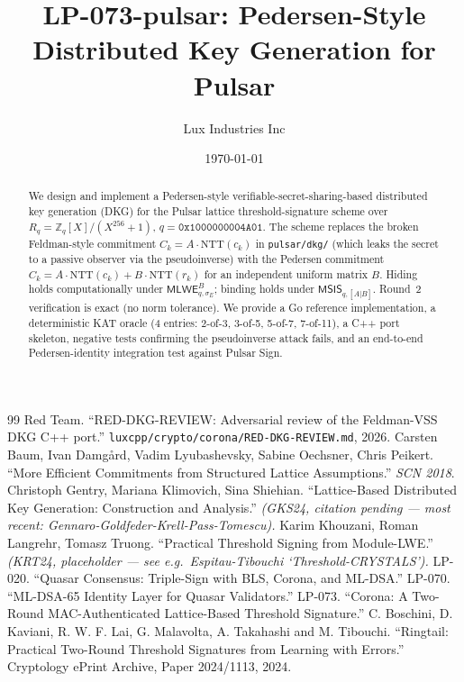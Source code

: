 \documentclass[11pt,a4paper]{article}
\title{LP-073-pulsar: Pedersen-Style Distributed Key Generation for Pulsar}
\author{Lux Industries Inc}
\date{\today}
\begin{document}
\maketitle

\begin{abstract}
We design and implement a Pedersen-style verifiable-secret-sharing-based
distributed key generation (DKG) for the Pulsar lattice threshold-signature
scheme over $R_q = \mathbb{Z}_q[X]/(X^{256}+1)$, $q = \mathtt{0x1000000004A01}$.
The scheme replaces the broken Feldman-style commitment
$C_k = A \cdot \mathrm{NTT}(c_k)$ in \texttt{pulsar/dkg/} (which leaks the
secret to a passive observer via the pseudoinverse) with the
Pedersen commitment $C_k = A \cdot \mathrm{NTT}(c_k) + B \cdot \mathrm{NTT}(r_k)$
for an independent uniform matrix $B$.  Hiding holds computationally under
$\mathsf{MLWE}_{q,\sigma_E}^B$; binding holds under
$\mathsf{MSIS}_{q,[A|B]}$.  Round~2 verification is exact (no norm
tolerance).  We provide a Go reference implementation, a deterministic KAT
oracle (4 entries: 2-of-3, 3-of-5, 5-of-7, 7-of-11), a C++ port skeleton,
negative tests confirming the pseudoinverse attack fails, and an
end-to-end Pedersen-identity integration test against Pulsar Sign.
\end{abstract}

\providecommand{\luxref}[1]{[#1]}



\begin{thebibliography}{99}
Red Team.  ``RED-DKG-REVIEW: Adversarial review of the Feldman-VSS DKG
C++ port.''  \texttt{luxcpp/crypto/corona/RED-DKG-REVIEW.md}, 2026.
Carsten Baum, Ivan Damg\aa{}rd, Vadim Lyubashevsky, Sabine Oechsner,
Chris Peikert.  ``More Efficient Commitments from Structured Lattice
Assumptions.''  \emph{SCN 2018}.
Christoph Gentry, Mariana Klimovich, Sina Shiehian.
``Lattice-Based Distributed Key Generation: Construction and Analysis.''
\emph{(GKS24, citation pending — most recent: Gennaro-Goldfeder-Krell-Pass-Tomescu).}
Karim Khouzani, Roman Langrehr, Tomasz Truong.
``Practical Threshold Signing from Module-LWE.''
\emph{(KRT24, placeholder — see e.g.\ Espitau-Tibouchi `Threshold-CRYSTALS').}
LP-020. ``Quasar Consensus: Triple-Sign with BLS, Corona, and ML-DSA.''
LP-070. ``ML-DSA-65 Identity Layer for Quasar Validators.''
LP-073. ``Corona: A Two-Round MAC-Authenticated Lattice-Based Threshold
Signature.''
C. Boschini, D. Kaviani, R. W. F. Lai, G. Malavolta, A. Takahashi and
M. Tibouchi.  ``Ringtail: Practical Two-Round Threshold Signatures from
Learning with Errors.''  Cryptology ePrint Archive, Paper 2024/1113, 2024.
\end{thebibliography}
\end{document}
